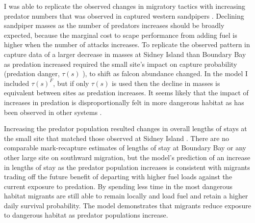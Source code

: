 
I was able to replicate the observed changes in migratory tactics with increasing predator numbers that was observed in captured western sandpipers \citep{ydenberg_western_2004}. Declining sandpiper masses as the number of predators increases should be broadly expected, because the marginal cost to scape performance from adding fuel is higher when the number of attacks increases. To replicate the observed pattern in capture data of a larger decrease in masses at Sidney Island than Boundary Bay as predation increased required the small site's impact on capture probability (predation danger, $\tau(s)$ ), to shift as falcon abundance changed. In the model I included $\tau(s)^F$, but if only $\tau(s)$ is used then the decline in masses is equivalent between sites as predation increases. It seems likely that the impact of increases in predation is disproportionally felt in more dangerous habitat as has been observed in other systems \citep{Brown2004}. 

Increasing the predator population resulted changes in overall lengths of stays at the small site that matched those observed at Sidney Island \citep{ydenberg_western_2004}. There are no comparable mark-recapture estimates of lengths of stay at Boundary Bay or any other large site on southward migration, but the model's prediction of an increase in lengths of stay as the predator population increases is consistent with migrants trading off the future benefit of departing with higher fuel loads against the current exposure to predation.  By spending less time in the most dangerous habitat migrants are still able to remain locally and load fuel and retain a higher daily survival probability. The model demonstrates that migrants reduce exposure to dangerous habitat as predator populations increase.

